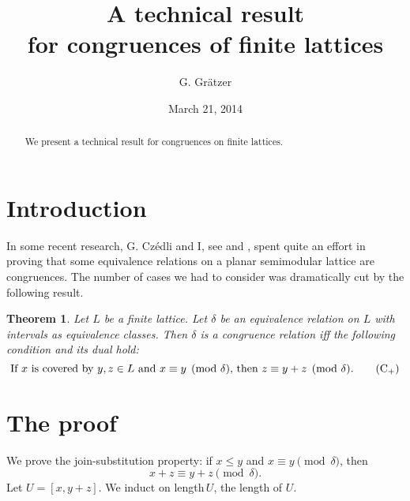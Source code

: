 \documentclass{amsart}
\newtheorem{theorem}{Theorem}
\begin{document}
\title{A technical result\\ for congruences of finite lattices}  
\author{G. Gr\"atzer} 
\address{Department of Mathematics\\
  University of Manitoba\\
  Winnipeg, MB R3T 2N2\\
  Canada}
\date{March 21, 2014}
\begin{abstract}
We present a technical result for congruences on finite lattices.
\end{abstract}
\maketitle

\section{Introduction}\label{S:Introduction}%
In some recent research, G. Cz\'edli
and I, see \cite{gC13} and \cite{gG14}, spent quite an effort
in proving that some equivalence relations 
on a planar semimodular lattice are congruences. 
The number of cases we had to consider
was dramatically cut by the following result.

\begin{theorem}\label{T:technical}%
Let $L$ be a finite lattice. 
Let $\delta$ be an equivalence relation on $L$
with intervals as equivalence classes.
Then $\delta$ is a congruence relation if{}f 
the following condition and its dual hold:
\begin{equation}\label{E:cover}%
\text{If $x$ is covered by $y,z \in L$ 
and $x \equiv y \pmod{\delta}$,
then $z \equiv y + z \pmod{\delta}$.}\tag{C${}_{+}$}
\end{equation}
\end{theorem}

\section{The proof}\label{Proof}%
We prove the join-substitution property:  
if $x \leq y$ and $x \equiv y \pmod{\delta}$, then
\begin{equation}\label{E:Cjoin}%
x + z \equiv y + z \pmod{\delta}.
\end{equation}
Let $U = [x, y+ z]$.
We induct on length\,$U$, the length of $U$.  
\end{document}
